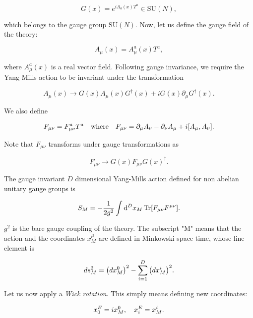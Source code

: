 \documentclass[reqno,12pt]{article}
\numberwithin{equation}{section}
\newcommand{\SU}{\mathrm{SU}}
\begin{document}
\begin{equation} \label{eq:gauge_trans}
	G(x) = e^{i \Lambda_a(x) T^a} \in \SU(N),
\end{equation}

which belongs to the gauge group $\SU(N)$. Now, let us define the gauge field of the theory: 

\begin{equation}
	A_\mu(x) = A_\mu^a(x) T^a,
\end{equation}

where $A_\mu^a(x)$ is a real vector field. Following gauge invariance, we require the Yang-Mills action to be invariant
under the transformation

\begin{equation} \label{eq:A_mu_gauge_trans}
	A_\mu(x) \rightarrow G(x) A_\mu(x) G^\dagger(x) + i G(x) \partial_\mu G^\dagger(x).
\end{equation}

We also define

\begin{equation}
	F_{\mu\nu} = F_{\mu\nu}^a T^a \qq{where} 
	F_{\mu\nu} = \partial_\mu A_\nu - \partial_\nu A_\mu + i \qty[A_\mu, A_\nu].
\end{equation}

Note that $F_{\mu\nu}$ transforms under gauge transformations as

\begin{equation}
	F_{\mu\nu} \rightarrow G(x) F_{\mu\nu} G(x)^\dagger.
\end{equation}

The gauge invariant $D$ dimensional Yang-Mills action 
defined for non abelian unitary gauge groups is

\begin{equation} \label{eq:ym_action_mink}
	S_M = -\frac{1}{2g^2} \int \dd[D]{x_M} \Tr[F_{\mu\nu}F^{\mu\nu}].
\end{equation}

$g^2$ is the bare gauge coupling of the theory. The subscript "M" means that the action and the coordinates $x_M^\mu$ are defined
in Minkowski space time, whose line element is

\begin{equation} \label{eq:line_element}
	ds_M^2 = \qty(dx_M^0)^2 - \sum_{i=1}^D \qty(dx_M^i)^2.
\end{equation}

Let us now apply a \textit{Wick rotation}. This simply means defining new coordinates:

\begin{equation} \label{eq:wick_rotation}
	x_0^E = i x^0_M \qc x_i^E = x_M^i.
\end{equation}
\end{document}
